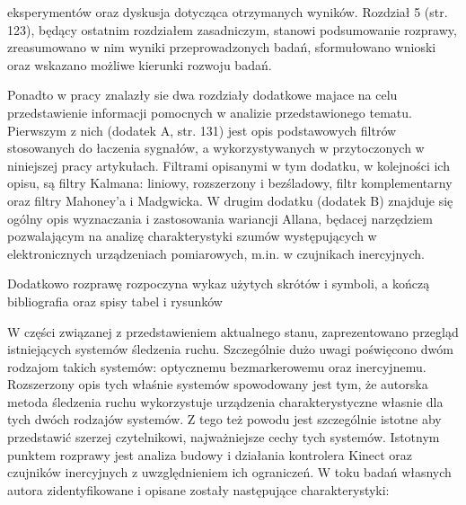 \documentclass[10pt,a4paper]{article}
\begin{document}
\begin{FlushLeft}
eksperymentów oraz dyskusja dotycząca otrzymanych wyników. Rozdział 5 (str. 123), będący ostatnim rozdziałem zasadniczym, stanowi podsumowanie rozprawy, zreasumowano w nim wyniki przeprowadzonych badań, sformułowano wnioski oraz wskazano możliwe kierunki rozwoju badań.

Ponadto w pracy znalazły sie dwa rozdziały dodatkowe  majace na celu przedstawienie informacji pomocnych w analizie przedstawionego tematu. Pierwszym z nich (dodatek A, str. 131) jest opis podstawowych filtrów stosowanych do łaczenia sygnałów, a wykorzystywanych w przytoczonych w niniejszej pracy artykułach. Filtrami opisanymi w tym dodatku, w kolejności ich opisu, są filtry Kalmana: liniowy, rozszerzony i bezśladowy, filtr komplementarny oraz filtry Mahoney’a i Madgwicka. W drugim dodatku (dodatek B) znajduje się ogólny opis wyznaczania i zastosowania wariancji Allana, będacej narzędziem pozwalającym na analizę charakterystyki szumów występujących w elektronicznych urządzeniach pomiarowych, m.in. w czujnikach inercyjnych.

Dodatkowo rozprawę rozpoczyna wykaz użytych skrótów i symboli, a kończą bibliografia oraz spisy tabel i rysunków

W części związanej z przedstawieniem aktualnego stanu, zaprezentowano przegląd istniejących systemów śledzenia ruchu. Szczególnie dużo uwagi poświęcono dwóm rodzajom takich systemów: optycznemu bezmarkerowemu oraz inercyjnemu. Rozszerzony opis tych właśnie systemów spowodowany jest tym, że autorska metoda śledzenia ruchu wykorzystuje urządzenia charakterystyczne własnie dla tych dwóch rodzajów systemów. Z tego też powodu jest szczególnie istotne aby przedstawić szerzej czytelnikowi, najważniejsze cechy tych systemów. Istotnym punktem rozprawy jest analiza budowy i działania kontrolera Kinect oraz czujników inercyjnych z uwzględnieniem ich ograniczeń. W toku badań własnych autora zidentyfikowane i opisane zostały następujące charakterystyki:


\end{FlushLeft}
\end{document}
